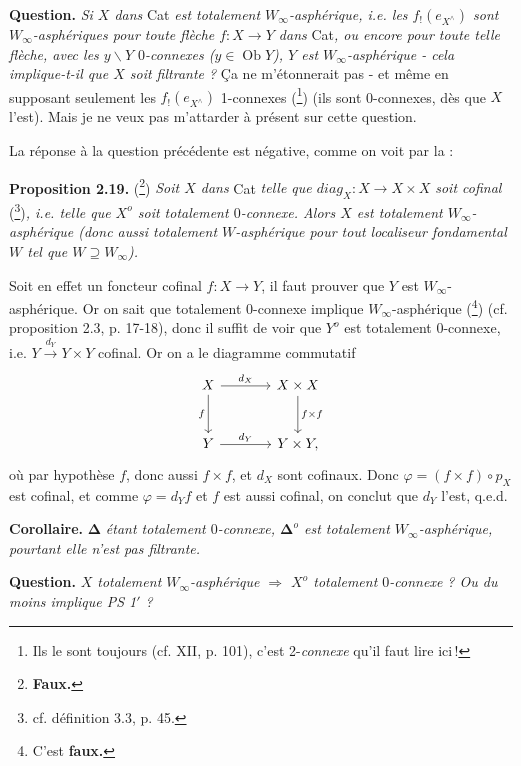 \documentclass[11pt]{article}
\newcommand{\printedpage}[1]{\marginpar{\footnotesize p.~#1}}
\newcommand{\msp}[1]{\marginpar{\footnotesize [#1]}}
\newcommand{\Ob}{\operatorname{Ob}}
\begin{document}
\msp{page 36}
\noindent\textbf{Question.} \textit{Si $X$ dans} Cat \textit{est totalement $W_\infty$-asphérique, i.e. les $f_!(e_{X^\wedge})$ sont $W_\infty$-asphériques pour toute flèche $f : X \longrightarrow Y$ dans} Cat\textit{, ou encore pour toute telle flèche, avec les $y\backslash Y$ $0$-connexes ($y \in \Ob Y$), $Y$ est $W_\infty$-asphérique - cela implique-t-il que $X$ soit filtrante ?} Ça ne m'étonnerait pas - et même en supposant seulement les $f_!(e_{X^\wedge})$ 1-connexes (\footnote[42]{Ils le sont toujours (cf. XII, p. 101), c'est 2-\textit{connexe} qu'il faut lire ici\,!}) (ils sont 0-connexes, dès que $X$ l'est). Mais je ne veux pas m'attarder à présent sur cette question.

La réponse à la question précédente est négative, comme on voit par la :

\printedpage{22}

\noindent\textbf{Proposition 2.19.} (\footnote[43]{\textbf{Faux.}}) \textit{Soit $X$ dans} Cat \textit{telle que $\mathit{diag}_X : X \longrightarrow X \times X$ soit cofinal} (\footnote[44]{cf. définition 3.3, p. 45.})\textit{, i.e. telle que $X^o$ soit totalement $0$-connexe. Alors $X$ est totalement $W_\infty$-asphérique (donc aussi totalement $W$-asphérique pour tout localiseur fondamental $W$ tel que $W \supseteq W_\infty$).}

Soit en effet un foncteur cofinal $f : X \longrightarrow Y$, il faut prouver que $Y$ est $W_\infty$-asphérique. Or on sait que totalement 0-connexe implique $W_\infty$-asphérique (\footnote[45]{C'est \textbf{faux.}}) (cf. proposition 2.3, p. 17-18), donc il suffit de voir que $Y^o$ est totalement 0-connexe, i.e. $Y \xrightarrow{d_Y} Y \times Y$ cofinal. Or on a le diagramme commutatif
\[
\begin{tikzcd}[row sep=large, column sep=large]
X \arrow[r, "d_X"] \arrow[d, "f"'] & X \times X \arrow[d, "f \times f"] \\
Y \arrow[r, "d_Y"] & Y \times Y,
\end{tikzcd}
\]
où par hypothèse $f$, donc aussi $f \times f$, et $d_X$ sont cofinaux. Donc $\varphi = (f \times f) \circ p_X$ est cofinal, et comme $\varphi = d_Y f$ et $f$ est aussi cofinal, on conclut que $d_Y$ l'est, q.e.d.

\noindent\textbf{Corollaire.} $\boldsymbol{\Delta}$ \textit{étant totalement $0$-connexe, $\boldsymbol{\Delta}^o$ est totalement $W_\infty$-asphérique, pourtant elle n'est pas filtrante.}

\noindent\textbf{Question.} \textit{$X$ totalement $W_\infty$-asphérique $\Longrightarrow$ $X^o$ totalement $0$-connexe ? Ou du moins implique PS 1$'$ ?}
\end{document}
